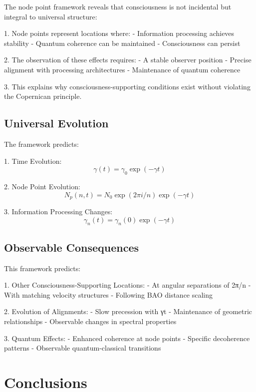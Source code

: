 \documentclass{article}
\begin{document}
The node point framework reveals that consciousness is not incidental but integral to universal structure:

1. Node points represent locations where:
- Information processing achieves stability
- Quantum coherence can be maintained
- Consciousness can persist

2. The observation of these effects requires:
- A stable observer position
- Precise alignment with processing architectures
- Maintenance of quantum coherence

3. This explains why consciousness-supporting conditions exist without violating the Copernican principle.

\subsection{Universal Evolution}

The framework predicts:

1. Time Evolution:
\begin{equation}
\gamma(t) = \gamma_0\exp(-\gamma t)
\end{equation}

2. Node Point Evolution:
\begin{equation}
N_p(n,t) = N_0\exp(2\pi i/n)\exp(-\gamma t)
\end{equation}

3. Information Processing Changes:
\begin{equation}
\gamma_n(t) = \gamma_n(0)\exp(-\gamma t)
\end{equation}

\subsection{Observable Consequences}

This framework predicts:

1. Other Consciousness-Supporting Locations:
- At angular separations of 2π/n
- With matching velocity structures
- Following BAO distance scaling

2. Evolution of Alignments:
- Slow precession with γt
- Maintenance of geometric relationships
- Observable changes in spectral properties

3. Quantum Effects:
- Enhanced coherence at node points
- Specific decoherence patterns
- Observable quantum-classical transitions

\section{Conclusions}
\end{document}
